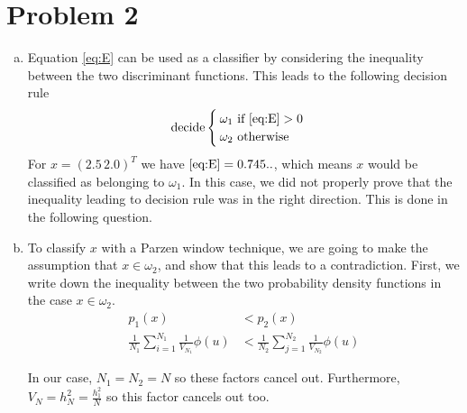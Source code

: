 \documentclass[a4paper, 10pt, twoside]{article}
\begin{document}
\section*{Problem 2}
\begin{enumerate}[a)]
    \item Equation \eqref{eq:E} can be used as a classifier by considering the inequality between the two discriminant functions. This leads to the following decision rule
          \begin{align*}
              \text{decide}
              \begin{cases}
                  \omega_1 \text{ if \eqref{eq:E}} > 0 \\
                  \omega_2 \text{ otherwise}
              \end{cases}
          \end{align*}
          For $x = (2.5 \, 2.0)^T$ we have $\eqref{eq:E} = 0.745..$, which means $x$ would be classified as belonging to $\omega_1$. In this case, we did not properly prove that the inequality leading to decision rule was in the right direction. This is done in the following question.
    \item
          To classify $x$ with a Parzen window technique, we are going to make the assumption that $x \in \omega_2$, and show that this leads to a contradiction. First, we write down the inequality between the two probability density functions in the case $x \in \omega_2$.
          \begin{align*}
              p_1(x)                                                & < p_2(x)                                                \\
              \frac{1}{N_1}\sum_{i=1}^{N_1}\frac{1}{V_{N_1}}\phi(u) & < \frac{1}{N_2}\sum_{j=1}^{N_2}\frac{1}{V_{N_2}}\phi(u)
          \end{align*}

          In our case, $N_1=N_2=N$ so these factors cancel out. Furthermore, $V_N = h_N^2 = \frac{h_1^2}{N}$ so this factor cancels out too.


\end{enumerate}
\end{document}

